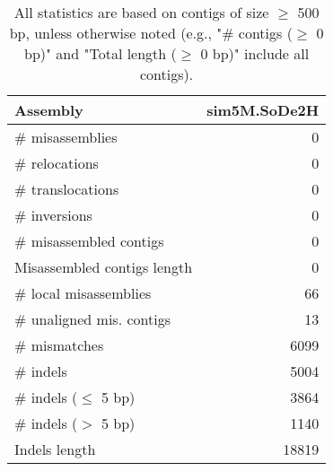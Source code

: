 \documentclass[12pt,a4paper]{article}
\begin{document}
\begin{table}[ht]
\begin{center}
\caption{All statistics are based on contigs of size $\geq$ 500 bp, unless otherwise noted (e.g., "\# contigs ($\geq$ 0 bp)" and "Total length ($\geq$ 0 bp)" include all contigs).}
\begin{tabular}{|l*{1}{|r}|}
\hline
Assembly & sim5M.SoDe2H \\ \hline
\# misassemblies & 0 \\ \hline
\hspace{5mm}\# relocations & 0 \\ \hline
\hspace{5mm}\# translocations & 0 \\ \hline
\hspace{5mm}\# inversions & 0 \\ \hline
\# misassembled contigs & 0 \\ \hline
Misassembled contigs length & 0 \\ \hline
\# local misassemblies & 66 \\ \hline
\# unaligned mis. contigs & 13 \\ \hline
\# mismatches & 6099 \\ \hline
\# indels & 5004 \\ \hline
\hspace{5mm}\# indels ($\leq$ 5 bp) & 3864 \\ \hline
\hspace{5mm}\# indels ($>$ 5 bp) & 1140 \\ \hline
Indels length & 18819 \\ \hline
\end{tabular}
\end{center}
\end{table}
\end{document}
